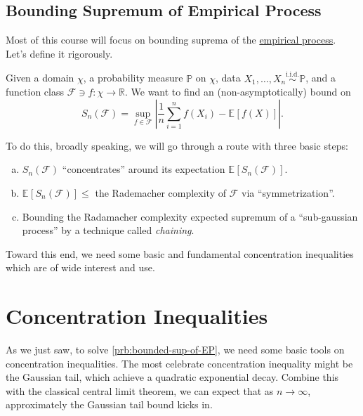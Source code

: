 \section{Bounding Supremum of Empirical Process}
Most of this course will focus on bounding suprema of the \hyperref[def:EP]{empirical process}. Let's define it rigorously.

\begin{problem}\label{prb:bounded-sup-of-EP}
Given a domain \(\chi \), a probability measure \(\mathbb{P} \) on \(\chi \), data \(X_1, \dots , X_n \overset{\text{i.i.d.} }{\sim } \mathbb{P} \), and a function class \(\mathscr{F}\ni f \colon \chi \to \mathbb{R}  \). We want to find an (non-asymptotically) bound on
\[
  S_n(\mathscr{F} ) = \sup _{f\in \mathscr{F} } \left\vert \frac{1}{n} \sum_{i=1}^{n} f(X_i) - \mathbb{E}_{}\left[f(X) \right]  \right\vert.
\]
\end{problem}
\begin{answer}
  To do this, broadly speaking, we will go through a route with three basic steps:
  \begin{enumerate}[(a)]
    \item \(S_n(\mathscr{F} )\) ``concentrates'' around its expectation \(\mathbb{E}_{}\left[S_n(\mathscr{F} ) \right] \).
    \item \(\mathbb{E}_{}\left[S_n(\mathscr{F} ) \right] \leq \) the Rademacher complexity of \(\mathscr{F} \) via ``symmetrization''.
    \item Bounding the Radamacher complexity expected supremum of a ``sub-gaussian process'' by a technique called \emph{chaining}.
  \end{enumerate}
\end{answer}

Toward this end, we need some basic and fundamental concentration inequalities which are of wide interest and use.

\chapter{Concentration Inequalities}
As we just saw, to solve \autoref{prb:bounded-sup-of-EP}, we need some basic tools on concentration inequalities. The most celebrate concentration inequality might be the Gaussian tail, which achieve a quadratic exponential decay. Combine this with the classical central limit theorem, we can expect that as \(n \to \infty \), approximately the Gaussian tail bound kicks in.


